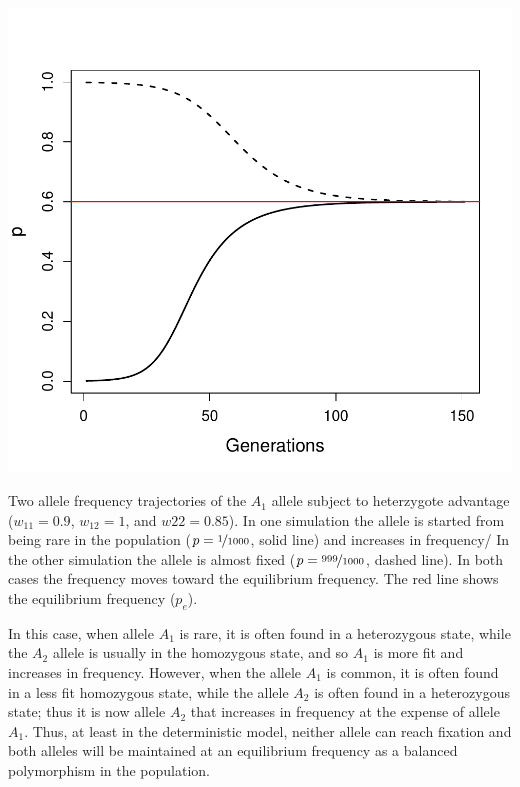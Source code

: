 \begin{marginfigure}[2cm]
\begin{center}
  \includegraphics[width = \textwidth]{figures/het_advant_traj.pdf}
\end{center}
\caption{Two allele frequency trajectories of the $A_1$ allele subject to
  heterzygote advantage ($w_{11}=0.9$, $w_{12}=1$, and $w22=0.85$). In
one simulation the allele is started from being rare in the population
($p=\nicefrac{1}{1000}$, solid line) and increases in frequency/ In
the other simulation the allele is almost
fixed ($p=\nicefrac{999}{1000}$, dashed line). In both cases the
frequency moves toward the equilibrium frequency. The red line shows
the equilibrium frequency ($p_e$). } \label{fig:het_advant_traj}
\end{marginfigure}


In this case, when allele $A_1$ is rare, it is often found in a
heterozygous state, while the $A_2$ allele is usually in the
homozygous state, and so $A_1$ is more fit and increases in frequency. However, when
the allele $A_1$ is common, it is often found in a less fit homozygous state, while
the allele $A_2$ is often found in a heterozygous state; thus it is
now allele $A_2$ that increases in frequency at the expense of allele
$A_1$. Thus, at least in the deterministic model, neither allele can
reach fixation and both alleles will be maintained at an equilibrium frequency as a balanced
polymorphism in the population. 


